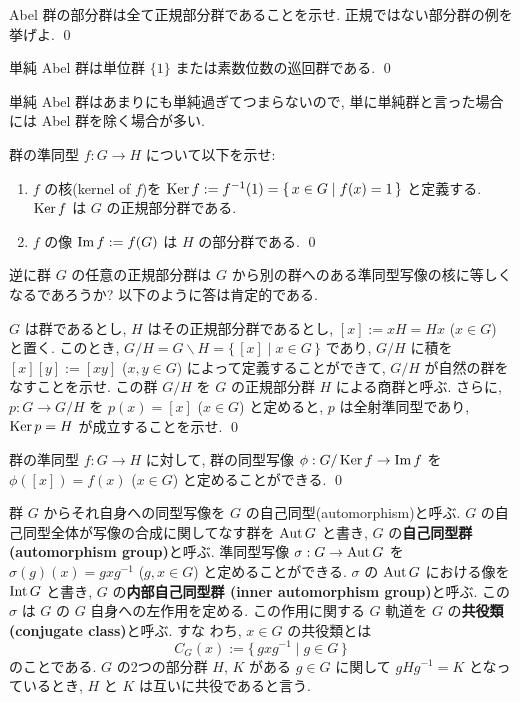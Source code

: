\documentclass[12pt,twoside]{jarticle}
\def\Aut{\mathop{\text{\rm Aut}}\nolimits}
\def\Int{\mathop{\text{\rm Int}}\nolimits}
\def\Int{\mathop{\text{\rm Int}}\nolimits}
\def\Ker{\mathop{\text{\rm Ker}}\nolimits}   %
\def\Im{\mathop{\text{\rm Im}}\nolimits}     %
\begin{document}
\begin{question}
  Abel 群の部分群は全て正規部分群であることを示せ. 
  正規ではない部分群の例を挙げよ. 
  \qed
\end{question}

\begin{question}
  単純 Abel 群は単位群 $\{1\}$ または素数位数の巡回群である. \qed
\end{question}

単純 Abel 群はあまりにも単純過ぎてつまらないので, 単に単純群と言った場合には
Abel 群を除く場合が多い.

\begin{question}
  群の準同型 $f:G\to H$ について以下を示せ:
  \begin{enumerate}
  \item $f$ の核(kernel of $f$)を %
    \(
      \Ker f := f^{-1}(1) = \{\, x\in G \mid f(x) = 1 \,\}
    \) 
    と定義する. $\Ker f$ は $G$ の正規部分群である.
  \item $f$ の像 $\Im f := f(G)$ は $H$ の部分群である.
    \qed
  \end{enumerate}
\end{question}

逆に群 $G$ の任意の正規部分群は $G$ から別の群へのある準同型写像の核に等しく
なるであろうか? 以下のように答は肯定的である.

\begin{question}
  $G$ は群であるとし, $H$ はその正規部分群であるとし, 
  $[x]:=xH=Hx$ ($x\in G$) と置く. 
  このとき, $G/H = G \backslash H = \{\,[x]\mid x\in G\,\}$ であり, 
  $G/H$ に積を $[x][y] := [xy]$ ($x,y\in G$) によって定義することができて, 
  $G/H$ が自然の群をなすことを示せ. 
  この群 $G/H$ を $G$ の正規部分群 $H$ による商群と呼ぶ.
  さらに, $p:G\to G/H$ を $p(x)=[x]$ ($x\in G$) と定めると,
  $p$ は全射準同型であり, $\Ker p = H$ が成立することを示せ. \qed
\end{question}

\begin{question}
  群の準同型 $f:G\to H$ に対して, 群の同型写像 $\phi:G/\Ker f\to \Im f$ を %
  $\phi([x]) = f(x)$ ($x\in G$) と定めることができる.
  \qed
\end{question}

群 $G$ からそれ自身への同型写像を $G$ の自己同型(automorphism)と呼ぶ.
$G$ の自己同型全体が写像の合成に関してなす群を $\Aut G$ と書き, 
$G$ の{\bf 自己同型群 (automorphism group)}と呼ぶ.
準同型写像 $\sigma:G\to \Aut G$ を %
$\sigma(g)(x) = gxg^{-1}$ ($g,x\in G$) と定めることができる.
$\sigma$ の $\Aut G$ における像を $\Int G$ と書き, 
$G$ の{\bf 内部自己同型群 (inner automorphism group)}と呼ぶ.
この $\sigma$ は $G$ の $G$ 自身への左作用を定める.
この作用に関する $G$ 軌道を $G$ の{\bf 共役類 (conjugate class)}と呼ぶ. すな
わち, $x\in G$ の共役類とは
\begin{equation*}
  C_G(x) := \{\, gxg^{-1} \mid g\in G \,\}
\end{equation*}
のことである. $G$ の2つの部分群 $H$, $K$ がある $g\in G$ に関して %
$gHg^{-1} = K$ となっているとき, $H$ と $K$ は互いに共役であると言う.
\end{document}
